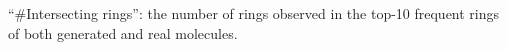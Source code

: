 \begin{table*}[t!]
\begin{scriptsize}
\begin{threeparttable}
\begin{footnotesize}
\begin{tablenotes}
{		%
		``\#Intersecting rings'': the number of rings observed in the top-10 frequent rings of both generated and real molecules. }
		\par
	\end{tablenotes}
\end{footnotesize}
\end{threeparttable}
\end{scriptsize}
  \vspace{-10pt}    
\end{table*}
